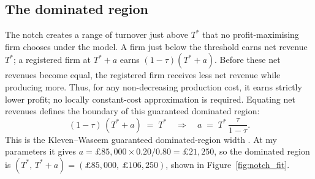\subsection{The dominated region}
\label{ssec:dominated}

The notch creates a range of turnover just above $T^{*}$ that no
profit-maximising firm chooses under the model. A firm just below the threshold
earns net revenue $T^{*}$; a registered firm at $T^{*}+a$ earns
$(1-\tau)(T^{*}+a)$. Before these net revenues become equal, the registered
firm receives less net revenue while producing more. Thus, for any
non-decreasing production cost, it earns strictly lower profit; no locally
constant-cost approximation is required. Equating net revenues defines the
boundary of this guaranteed dominated region:
\begin{equation}
  (1-\tau)\,(T^{*}+a) \;=\; T^{*}
  \quad\Longrightarrow\quad
  a \;=\; T^{*}\,\frac{\tau}{1-\tau} .
  \label{eq:dominated}
\end{equation}
This is the Kleven--Waseem guaranteed dominated-region width
\citep{klevenwaseem2013}. At
my parameters it gives $a = \pounds85{,}000\times 0.20/0.80 = \pounds21{,}250$,
so the dominated region is
$(T^{*},\,T^{*}+a)=(\pounds85{,}000,\ \pounds106{,}250)$, shown in
Figure~\ref{fig:notch_fit}.

